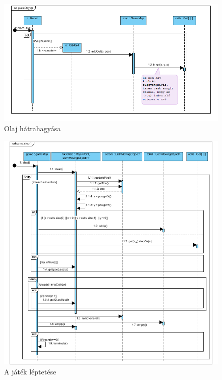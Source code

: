 \begin{figure}[!htbp]
	\begin{center}
		\includegraphics[width=166mm, center]{./chapters/chapter04/oily.png}
		\caption{Olaj hátrahagyása}
	\end{center}
\end{figure}

\clearpage

\begin{figure}[!htbp]
	\begin{center}
		\includegraphics[width=195mm, center]{./chapters/chapter04/step.png}
		\caption{A játék léptetése}
	\end{center}
\end{figure}

